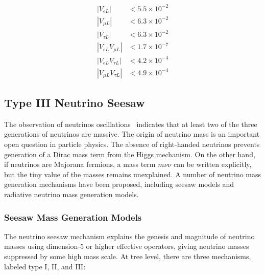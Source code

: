 \begin{align}
|V_{e L}| & <5.5\times10^{-2}\\
|V_{\mu L}| & <6.3\times10^{-2}\\
|V_{\tau L}| & <6.3\times10^{-2}\\
|V_{e L}V_{\mu L}| & <1.7\times10^{-7}\\
|V_{e L}V_{\tau L}| & <4.2\times10^{-4}\\
|V_{\mu L}V_{\tau L}| & <4.9\times10^{-4}
\end{align}


\subsection{Type III Neutrino Seesaw}
%
%

The observation of neutrinos oscillations~\cite{Agashe:2014kda} indicates that at least two of the three generations of neutrinos are massive. The origin of neutrino mass is an important open question in particle physics. The absence of right-handed neutrinos prevents generation of a Dirac mass term from the Higgs mechanism. On the other hand, if neutrinos are Majorana fermions, a mass term $m\nu\nu$ can be written explicitly, but the tiny value of the masses remains unexplained. A number of neutrino mass generation mechanisms have been proposed, including seesaw models and radiative neutrino mass generation models. 

\subsubsection{Seesaw Mass Generation Models}
The neutrino seesaw mechanism explains the genesis and magnitude of neutrino masses using dimension-5 or higher effective operators, giving neutrino masses suppressed by some high mass scale. At tree level, there are three mechanisms, labeled type I, II, and III:

